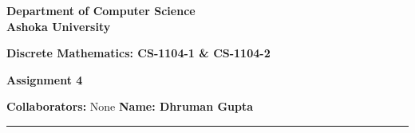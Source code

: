 \documentclass[a4paper]{article}
\begin{document}
\begin{center}
{\large \bf \color{red}  Department of Computer Science} \\
{\large \bf \color{red}  Ashoka University} \\

\vspace{0.1in}

{\large \bf \color{blue}  Discrete Mathematics: CS-1104-1 \& CS-1104-2}

\vspace{0.05in}

    { \bf \color{YellowOrange} Assignment 4}
\end{center}
\medskip

{\textbf{Collaborators:} None} \hfill {\textbf{Name: Dhruman Gupta} }

\bigskip
\hrule


\end{document}
